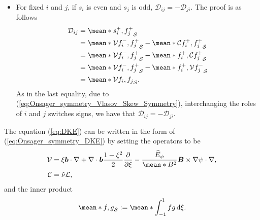 \documentclass[10pt]{iopart}
\newcommand{\Lorentz}{\mathcal{L}}
\begin{document}
\begin{itemize}
	\item For fixed $i$ and $j$, if $s_i$ is even and $s_j$ is odd, $\mathcal{D}_{ij} = -\mathcal{D}_{ji}$. The proof is as follows 
	\begin{align*}
		\mathcal{D}_{ij} & = \mean*{s_i^+, f_j^+}_{\mathcal{S}} \\
		& 
		= \mean*{\mathcal{V} f_i^-, f_j^+}_{\mathcal{S}}
		- \mean*{\mathcal{C} f_i^+, f_j^+}_{\mathcal{S}} \\
		& 
		= \mean*{\mathcal{V} f_i^-, f_j^+}_{\mathcal{S}}
		- \mean*{f_i^+, \mathcal{C}  f_j^+}_{\mathcal{S}} \\
		& 
		= \mean*{\mathcal{V} f_i^-, f_j^+}_{\mathcal{S}}
		- \mean*{f_i^+, \mathcal{V}  f_j^-}_{\mathcal{S}} \\
		& 
		= \mean*{\mathcal{V} f_i, f_j}_{\mathcal{S}}.
	\end{align*}
	As in the last equality, due to (\ref{eq:Onsager_symmetry_Vlasov_Skew_Symmetry}), interchanging the roles of $i$ and $j$ switches signs, we have that $\mathcal{D}_{ij} = -\mathcal{D}_{ji}$.
	
\end{itemize}

The equation (\ref{eq:DKE}) can be written in the form of (\ref{eq:Onsager_symmetry_DKE}) by setting
the operators to be
%
\begin{align}
	\mathcal{V} & = \xi \vb*{b}\cdot \nabla + \nabla\cdot\vb*{b} \frac{1-\xi^2}{2}\pdv{\xi}
	-  \frac{\widehat{E}_\psi}{\mean*{B^2}} \vb*{B}\times \nabla \psi \cdot \nabla,
	\\ 
	\mathcal{C} & = \hat{\nu} \Lorentz,
\end{align}
and the inner product
%
\begin{align}
	\mean*{f,g}_{\mathcal{S}}:= \mean*{\int_{-1}^{1}fg\dd{\xi}}.
	\label{eq:Onsager_Inner_Product}
\end{align}
\end{document}
